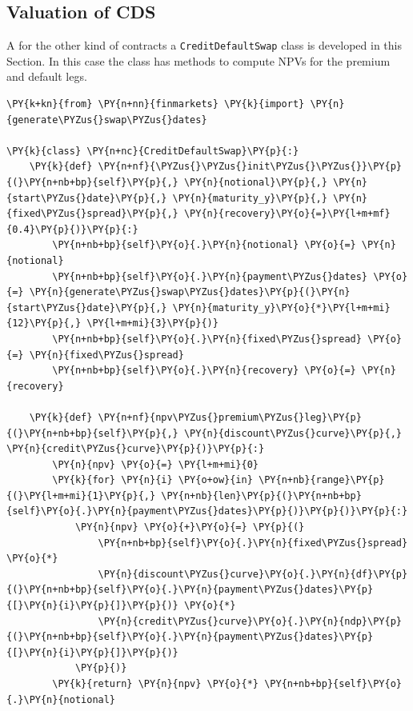 \subsection{Valuation of CDS}

A for the other kind of contracts a \texttt{CreditDefaultSwap} class is developed in this Section. In this case the class has methods to compute NPVs for the premium and default legs.

\begin{tcolorbox}[breakable, size=fbox, boxrule=1pt, pad at break*=1mm,colback=cellbackground, colframe=cellborder]
\begin{Verbatim}[commandchars=\\\{\}]
\PY{k+kn}{from} \PY{n+nn}{finmarkets} \PY{k}{import} \PY{n}{generate\PYZus{}swap\PYZus{}dates}
        
\PY{k}{class} \PY{n+nc}{CreditDefaultSwap}\PY{p}{:}
    \PY{k}{def} \PY{n+nf}{\PYZus{}\PYZus{}init\PYZus{}\PYZus{}}\PY{p}{(}\PY{n+nb+bp}{self}\PY{p}{,} \PY{n}{notional}\PY{p}{,} \PY{n}{start\PYZus{}date}\PY{p}{,} \PY{n}{maturity_y}\PY{p}{,} \PY{n}{fixed\PYZus{}spread}\PY{p}{,} \PY{n}{recovery}\PY{o}{=}\PY{l+m+mf}{0.4}\PY{p}{)}\PY{p}{:}
        \PY{n+nb+bp}{self}\PY{o}{.}\PY{n}{notional} \PY{o}{=} \PY{n}{notional}
        \PY{n+nb+bp}{self}\PY{o}{.}\PY{n}{payment\PYZus{}dates} \PY{o}{=} \PY{n}{generate\PYZus{}swap\PYZus{}dates}\PY{p}{(}\PY{n}{start\PYZus{}date}\PY{p}{,} \PY{n}{maturity_y}\PY{o}{*}\PY{l+m+mi}{12}\PY{p}{,} \PY{l+m+mi}{3}\PY{p}{)}
        \PY{n+nb+bp}{self}\PY{o}{.}\PY{n}{fixed\PYZus{}spread} \PY{o}{=} \PY{n}{fixed\PYZus{}spread}
        \PY{n+nb+bp}{self}\PY{o}{.}\PY{n}{recovery} \PY{o}{=} \PY{n}{recovery}
    
    \PY{k}{def} \PY{n+nf}{npv\PYZus{}premium\PYZus{}leg}\PY{p}{(}\PY{n+nb+bp}{self}\PY{p}{,} \PY{n}{discount\PYZus{}curve}\PY{p}{,} \PY{n}{credit\PYZus{}curve}\PY{p}{)}\PY{p}{:}
        \PY{n}{npv} \PY{o}{=} \PY{l+m+mi}{0}
        \PY{k}{for} \PY{n}{i} \PY{o+ow}{in} \PY{n+nb}{range}\PY{p}{(}\PY{l+m+mi}{1}\PY{p}{,} \PY{n+nb}{len}\PY{p}{(}\PY{n+nb+bp}{self}\PY{o}{.}\PY{n}{payment\PYZus{}dates}\PY{p}{)}\PY{p}{)}\PY{p}{:}
            \PY{n}{npv} \PY{o}{+}\PY{o}{=} \PY{p}{(}
                \PY{n+nb+bp}{self}\PY{o}{.}\PY{n}{fixed\PYZus{}spread} \PY{o}{*}
                \PY{n}{discount\PYZus{}curve}\PY{o}{.}\PY{n}{df}\PY{p}{(}\PY{n+nb+bp}{self}\PY{o}{.}\PY{n}{payment\PYZus{}dates}\PY{p}{[}\PY{n}{i}\PY{p}{]}\PY{p}{)} \PY{o}{*}
                \PY{n}{credit\PYZus{}curve}\PY{o}{.}\PY{n}{ndp}\PY{p}{(}\PY{n+nb+bp}{self}\PY{o}{.}\PY{n}{payment\PYZus{}dates}\PY{p}{[}\PY{n}{i}\PY{p}{]}\PY{p}{)}
            \PY{p}{)}
        \PY{k}{return} \PY{n}{npv} \PY{o}{*} \PY{n+nb+bp}{self}\PY{o}{.}\PY{n}{notional}
    

\end{Verbatim}
\end{tcolorbox}
